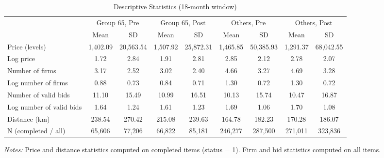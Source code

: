 \begin{table}[htbp]
\centering
\caption{Descriptive Statistics (18-month window)}
\label{tab:descstats}
\begin{adjustbox}{max width=\textwidth}
\begin{threeparttable}
\small
\begin{tabular}{lcccccccc}
\toprule
 & \multicolumn{2}{c}{Group 65, Pre} & \multicolumn{2}{c}{Group 65, Post} & \multicolumn{2}{c}{Others, Pre} & \multicolumn{2}{c}{Others, Post} \\
\cmidrule(lr){2-3} \cmidrule(lr){4-5} \cmidrule(lr){6-7} \cmidrule(lr){8-9}
 & Mean & SD & Mean & SD & Mean & SD & Mean & SD \\
\midrule
Price (levels) & 1,402.09 & 20,563.54 & 1,507.92 & 25,872.31 & 1,465.85 & 50,385.93 & 1,291.37 & 68,042.55 \\
Log price & 1.72 & 2.84 & 1.91 & 2.81 & 2.85 & 2.12 & 2.78 & 2.07 \\
Number of firms & 3.17 & 2.52 & 3.02 & 2.40 & 4.66 & 3.27 & 4.69 & 3.28 \\
Log number of firms & 0.88 & 0.73 & 0.84 & 0.71 & 1.30 & 0.72 & 1.30 & 0.72 \\
Number of valid bids & 11.10 & 15.49 & 10.99 & 16.51 & 10.13 & 15.74 & 10.47 & 16.87 \\
Log number of valid bids & 1.64 & 1.24 & 1.61 & 1.23 & 1.69 & 1.06 & 1.70 & 1.08 \\
Distance (km) & 238.54 & 270.42 & 215.08 & 239.63 & 164.78 & 182.23 & 170.28 & 186.07 \\
\midrule
N (completed / all) & 65,606 & 77,206 & 66,822 & 85,181 & 246,277 & 287,500 & 271,011 & 323,836 \\
\bottomrule
\end{tabular}
\begin{tablenotes}
\small
\item \textit{Notes:} Price and distance statistics computed on completed items (status = 1).
Firm and bid statistics computed on all items.
\end{tablenotes}
\end{threeparttable}
\end{adjustbox}
\end{table}
